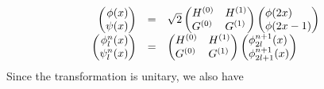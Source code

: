 \documentclass[letterpaper]{book}
\begin{document}
\begin{equation}
\begin{matrix}\hfill \left(\begin{matrix}\hfill \phi (x)\\\hfill \psi
(x)\end{matrix}\right)&\text{=}&\sqrt{2}\left(\begin{matrix}H^{(0)}\hfill\null &H^{(1)}\hfill\null \\G^{(0)}\hfill\null
&G^{(1)}\hfill\null \end{matrix}\right)\left(\begin{matrix}\phi (2x)\hfill\null \\\phi (2x-1)\hfill\null
\end{matrix}\right)\hfill\null \\\hfill \left(\begin{matrix}\hfill \phi _{l}^{n}(x)\\\hfill \psi
_{l}^{n}(x)\end{matrix}\right)&\text{=}&\left(\begin{matrix}H^{(0)}\hfill\null &H^{(1)}\hfill\null \\G^{(0)}\hfill\null
&G^{(1)}\hfill\null \end{matrix}\right)\left(\begin{matrix}\phi _{2l}^{n+1}(x)\hfill\null \\\phi
_{2l+1}^{n+1}(x)\hfill\null \end{matrix}\right)\hfill\null \end{matrix}
\end{equation}
Since the transformation is unitary, we also have
\end{document}
